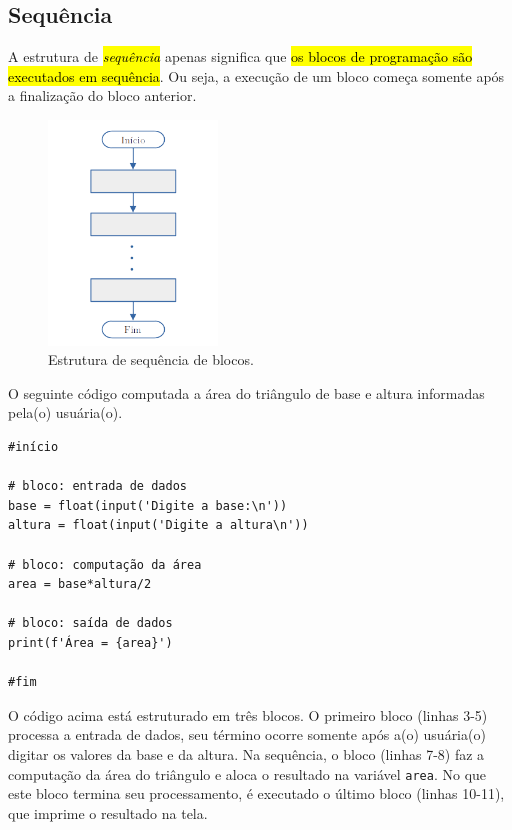\subsection{Sequência}

A estrutura de \hl{\emph{sequência}} apenas significa que \hl{os blocos de programação são executados em sequência}. Ou seja, a execução de um bloco começa somente após a finalização do bloco anterior.

\begin{figure}[H]
  \centering
  \includegraphics[width=0.4\textwidth]{./cap_progest/dados/fig_fg_sequencia/fig}
  \caption{Estrutura de sequência de blocos.}
  \label{cap_progest:fig:fg_sequencia}
\end{figure}

\begin{ex}
  O seguinte código computada a área do triângulo de base e altura informadas pela(o) usuária(o).
\begin{lstlisting}
#início

# bloco: entrada de dados
base = float(input('Digite a base:\n'))
altura = float(input('Digite a altura\n'))

# bloco: computação da área
area = base*altura/2

# bloco: saída de dados
print(f'Área = {area}')

#fim
\end{lstlisting}

  O código acima está estruturado em três blocos. O primeiro bloco (linhas 3-5) processa a entrada de dados, seu término ocorre somente após a(o) usuária(o) digitar os valores da base e da altura. Na sequência, o bloco (linhas 7-8) faz a computação da área do triângulo e aloca o resultado na variável \lstinline+area+. No que este bloco termina seu processamento, é executado o último bloco (linhas 10-11), que imprime o resultado na tela.
\end{ex}

